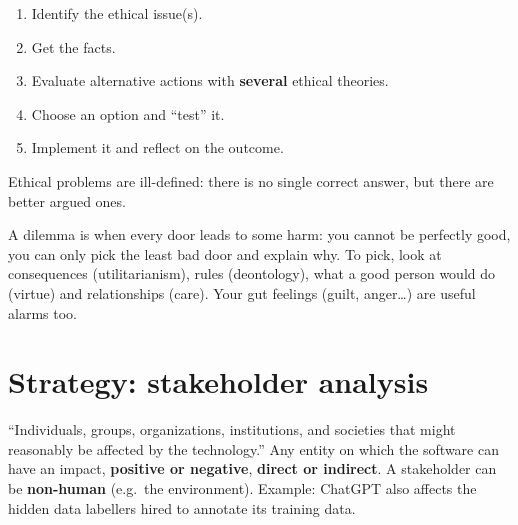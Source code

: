 \documentclass[11pt,a4paper,openany]{book}
\begin{document}
\begin{algbox}[title={An ethical decision-making framework (Markkula Center, 2021)}]
\begin{enumerate}
  \item Identify the ethical issue(s).
  \item Get the facts.
  \item Evaluate alternative actions with \textbf{several} ethical theories.
  \item Choose an option and ``test'' it.
  \item Implement it and reflect on the outcome.
\end{enumerate}
Ethical problems are ill-defined: there is no single correct answer, but there are better
argued ones.
\end{algbox}

\begin{goatbox}
A dilemma is when every door leads to some harm: you cannot be perfectly good, you can only
pick the least bad door and explain why. To pick, look at consequences (utilitarianism), rules
(deontology), what a good person would do (virtue) and relationships (care). Your gut feelings
(guilt, anger\ldots) are useful alarms too.
\end{goatbox}


\section{Strategy: stakeholder analysis}

\begin{defnbox}[title={Stakeholder (Value Sensitive Design)}]
``Individuals, groups, organizations, institutions, and societies that might reasonably be
affected by the technology.'' Any entity on which the software can have an impact,
\textbf{positive or negative}, \textbf{direct or indirect}. A stakeholder can be
\textbf{non-human} (e.g.\ the environment). Example: ChatGPT also affects the hidden data
labellers hired to annotate its training data.
\end{defnbox}
\end{document}
